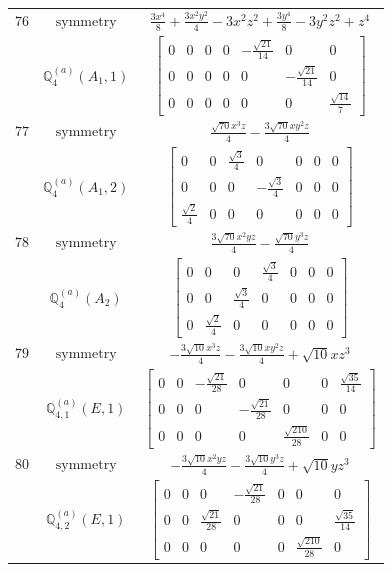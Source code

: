 \documentclass[fleqn,8pt,landscape]{jsarticle}
\begin{document}
\begin{longtable}{ccc}
$ 76 $ & $ \text{symmetry} $ & $ \frac{3 x^{4}}{8} + \frac{3 x^{2} y^{2}}{4} - 3 x^{2} z^{2} + \frac{3 y^{4}}{8} - 3 y^{2} z^{2} + z^{4} $ \\
$  $ & $ \mathbb{Q}_{4}^{(a)}(A_{1},1) $ & $ \begin{bmatrix} 0 & 0 & 0 & 0 & - \frac{\sqrt{21}}{14} & 0 & 0 \\ 0 & 0 & 0 & 0 & 0 & - \frac{\sqrt{21}}{14} & 0 \\ 0 & 0 & 0 & 0 & 0 & 0 & \frac{\sqrt{14}}{7} \end{bmatrix} $ \\ \hline
$ 77 $ & $ \text{symmetry} $ & $ \frac{\sqrt{70} x^{3} z}{4} - \frac{3 \sqrt{70} x y^{2} z}{4} $ \\
$  $ & $ \mathbb{Q}_{4}^{(a)}(A_{1},2) $ & $ \begin{bmatrix} 0 & 0 & \frac{\sqrt{3}}{4} & 0 & 0 & 0 & 0 \\ 0 & 0 & 0 & - \frac{\sqrt{3}}{4} & 0 & 0 & 0 \\ \frac{\sqrt{2}}{4} & 0 & 0 & 0 & 0 & 0 & 0 \end{bmatrix} $ \\ \hline
$ 78 $ & $ \text{symmetry} $ & $ \frac{3 \sqrt{70} x^{2} y z}{4} - \frac{\sqrt{70} y^{3} z}{4} $ \\
$  $ & $ \mathbb{Q}_{4}^{(a)}(A_{2}) $ & $ \begin{bmatrix} 0 & 0 & 0 & \frac{\sqrt{3}}{4} & 0 & 0 & 0 \\ 0 & 0 & \frac{\sqrt{3}}{4} & 0 & 0 & 0 & 0 \\ 0 & \frac{\sqrt{2}}{4} & 0 & 0 & 0 & 0 & 0 \end{bmatrix} $ \\ \hline
$ 79 $ & $ \text{symmetry} $ & $ - \frac{3 \sqrt{10} x^{3} z}{4} - \frac{3 \sqrt{10} x y^{2} z}{4} + \sqrt{10} x z^{3} $ \\
$  $ & $ \mathbb{Q}_{4,1}^{(a)}(E,1) $ & $ \begin{bmatrix} 0 & 0 & - \frac{\sqrt{21}}{28} & 0 & 0 & 0 & \frac{\sqrt{35}}{14} \\ 0 & 0 & 0 & - \frac{\sqrt{21}}{28} & 0 & 0 & 0 \\ 0 & 0 & 0 & 0 & \frac{\sqrt{210}}{28} & 0 & 0 \end{bmatrix} $ \\ \hline
$ 80 $ & $ \text{symmetry} $ & $ - \frac{3 \sqrt{10} x^{2} y z}{4} - \frac{3 \sqrt{10} y^{3} z}{4} + \sqrt{10} y z^{3} $ \\
$  $ & $ \mathbb{Q}_{4,2}^{(a)}(E,1) $ & $ \begin{bmatrix} 0 & 0 & 0 & - \frac{\sqrt{21}}{28} & 0 & 0 & 0 \\ 0 & 0 & \frac{\sqrt{21}}{28} & 0 & 0 & 0 & \frac{\sqrt{35}}{14} \\ 0 & 0 & 0 & 0 & 0 & \frac{\sqrt{210}}{28} & 0 \end{bmatrix} $ \\ \hline

\end{longtable}
\end{document}

